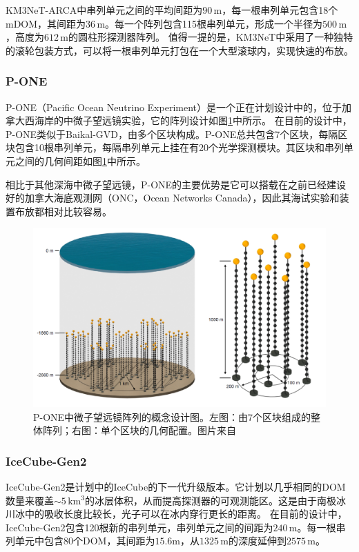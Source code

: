 KM3NeT-ARCA中串列单元之间的平均间距为$90\,\mathrm{m}$，每一根串列单元包含18个mDOM，其间距为$36\,\mathrm{m}$。每一个阵列包含115根串列单元，形成一个半径为$500\,\mathrm{m}$，高度为$612\,\mathrm{m}$的圆柱形探测器阵列。
值得一提的是，KM3NeT中采用了一种独特的滚轮包装方式，可以将一根串列单元打包在一个大型滚球内，实现快速的布放\cite{KM3NeT_deployment:2020}。

\subsubsection*{P-ONE}

P-ONE（Pacific Ocean Neutrino Experiment）是一个正在计划设计中的，位于加拿大西海岸的中微子望远镜实验\cite{P-ONE:2020, P-ONE_ICRC:2021}，它的阵列设计如图\ref{fig:P-One_array}中所示。
在目前的设计中，P-ONE类似于Baikal-GVD，由多个区块构成。P-ONE总共包含7个区块，每隔区块包含10根串列单元，每隔串列单元上挂在有20个光学探测模块。其区块和串列单元之间的几何间距如图\ref{fig:P-One_array}中所示。

相比于其他深海中微子望远镜，P-ONE的主要优势是它可以搭载在之前已经建设好的加拿大海底观测网（ONC，Ocean Networks Canada）\cite{P-ONE_ONC:2010}，因此其海试实验和装置布放都相对比较容易。

\begin{figure}[!htb]
    \centering
    \includegraphics[width=0.8\linewidth]{img/P-One_array.png}
    \caption{P-ONE中微子望远镜阵列的概念设计图。左图：由7个区块组成的整体阵列；右图：单个区块的几何配置。图片来自\parencite{P-ONE_ICRC:2021}}
    \label{fig:P-One_array}
\end{figure}


\subsubsection*{IceCube-Gen2}

IceCube-Gen2是计划中的IceCube的下一代升级版本\cite{IceCube-Gen2_white_paper:2020, IceCube-Gen2_VLVnT:2021}。它计划以几乎相同的DOM数量来覆盖$\sim5\,\mathrm{km^3}$的冰层体积，从而提高探测器的可观测能区。这是由于南极冰川冰中的吸收长度比较长，光子可以在冰内穿行更长的距离。
在目前的设计中，IceCube-Gen2包含120根新的串列单元，串列单元之间的间距为$240\,\mathrm{m}$。每一根串列单元中包含80个DOM，其间距为$15.6\mathrm{m}$，从$1325\,\mathrm{m}$的深度延伸到$2575\,\mathrm{m}$。

